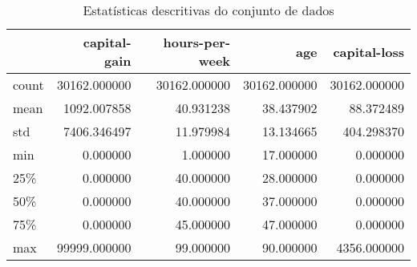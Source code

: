 \begin{table}
\centering
\caption{Estatísticas descritivas do conjunto de dados}
\label{tbl:descriptive_statistics}
\begin{tabular}{lrrrr}
\toprule
{} &  capital-gain &  hours-per-week &           age &  capital-loss \\
\midrule
count &  30162.000000 &    30162.000000 &  30162.000000 &  30162.000000 \\
mean  &   1092.007858 &       40.931238 &     38.437902 &     88.372489 \\
std   &   7406.346497 &       11.979984 &     13.134665 &    404.298370 \\
min   &      0.000000 &        1.000000 &     17.000000 &      0.000000 \\
25\%   &      0.000000 &       40.000000 &     28.000000 &      0.000000 \\
50\%   &      0.000000 &       40.000000 &     37.000000 &      0.000000 \\
75\%   &      0.000000 &       45.000000 &     47.000000 &      0.000000 \\
max   &  99999.000000 &       99.000000 &     90.000000 &   4356.000000 \\
\bottomrule
\end{tabular}
\end{table}
